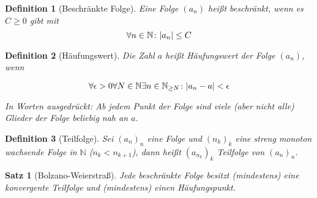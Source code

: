\documentclass{article}
\newtheorem*{definition}{Definition}
\newtheorem*{satz}{Satz}
\begin{document}
\begin{definition}[Beschränkte Folge]
  Eine Folge $\left( a_n \right)$ heißt beschränkt, wenn es $C \geq 0$ gibt mit
  \[
    \forall n \in \mathbb{N} \colon \abs{a_n} \leq C
  \]
\end{definition}

\begin{definition}[Häufungswert]
  Die Zahl $a$ heißt Häufungswert der Folge $\left(a_n\right)$, wenn

  \[
    \forall \epsilon > 0 \forall N \in \mathbb{N} \exists n \in \mathbb{N}_{\geq N} \colon \abs{a_n - a} < \epsilon
  \]

  In Worten ausgedrückt: Ab jedem Punkt der Folge sind viele (aber nicht alle) Glieder der Folge beliebig nah an $a$.
\end{definition}

\begin{definition}[Teilfolge]
  Sei $\left(a_n\right)_n$ eine Folge und $\left( n_k \right)_k$ eine streng monoton wachsende Folge in $\mathbb{N}$ ($n_k < n_{k+1}$),
  dann heißt $\left(a_{n_k}\right)_k$ Teilfolge von $\left(a_n\right)_n$.
\end{definition}

\begin{satz}[Bolzano-Weierstraß]
  Jede beschränkte Folge besitzt (mindestens) eine konvergente Teilfolge und (mindestens) einen Häufungspunkt.
\end{satz}
\end{document}
